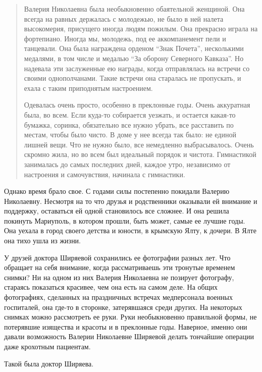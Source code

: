 \begin{quote}
{Валерия Николаевна была необыкновенно обаятельной женщиной. Она всегда на
равных держалась с молодежью, не было в ней налета высокомерия, присущего
иногда людям пожилым. Она прекрасно играла на фортепиано. Иногда мы, молодежь,
под ее аккомпанемент пели и танцевали. Она была награждена орденом \enquote{Знак
Почета}, несколькими медалями, в том числе и медалью \enquote{За оборону Северного
Кавказа}. Но надевала эти заслуженные ею награды, когда отправлялась на встречи
со своими однополчанами. Такие встречи она старалась не пропускать, и ехала с
таким приподнятым настроением.

Одевалась очень просто, особенно в преклонные годы. Очень аккуратная была, во
всем. Если куда-то собирается уезжать, и остается какая-то бумажка, соринка,
обязательно все нужно убрать, все расставить по местам, чтобы было чисто. В
доме у нее всегда так было: не единой лишней вещи. Что не нужно было, все
немедленно выбрасывалось. Очень скромно жила, но во всем был идеальный порядок
и чистота. Гимнастикой занималась до самых последних дней, каждое утро,
независимо от настроения и самочувствия, начинала с гимнастики.}

\end{quote}

Однако время брало свое. С годами силы постепенно покидали Валерию Николаевну.
Несмотря на то что друзья и родственники оказывали ей внимание и поддержку,
оставаться ей одной становилось все сложнее. И она решила покинуть Мариуполь, в
котором прошли, быть может, самые ее лучшие годы. Она уехала в город своего
детства и юности, в крымскую Ялту, к дочери. В Ялте она тихо ушла из жизни.

У друзей доктора Ширяевой сохранились ее фотографии разных лет. Что обращает на
себя внимание, когда рассматриваешь эти тронутые временем снимки? Ни на одном
из них Валерия Николаевна не позирует фотографу, стараясь показаться красивее,
чем она есть на самом деле. На общих фотографиях, сделанных на праздничных
встречах медперсонала военных госпиталей, она где-то  в сторонке, затерявшаяся
среди других. На некоторых снимках можно рассмотреть  ее руки. Руки
необыкновенно правильной формы, не потерявшие изящества и красоты и в
преклонные годы. Наверное, именно они давали возможность Валерии Николаевне
Ширяевой делать тончайшие операции даже крохотным пациентам.

Такой была доктор Ширяева.

